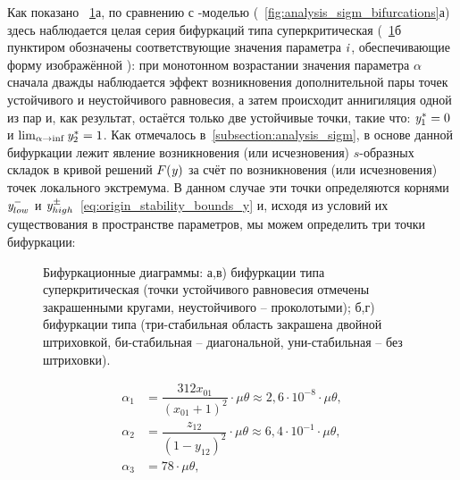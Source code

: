 Как показано \onfigure~\ref{fig:analysis_origin_bifurcations}а, по сравнению с -моделью (\seefigure~\ref{fig:analysis_sigm_bifurcations}а) здесь наблюдается целая серия бифуркаций типа суперкритическая  (\onfigure~\ref{fig:analysis_origin_bifurcations}б пунктиром обозначены соответствующие значения параметра $\mathit{i}$, обеспечивающие форму изображённой ): при монотонном возрастании значения параметра $\alpha$ сначала дважды наблюдается эффект возникновения дополнительной пары точек устойчивого и неустойчивого равновесия, а затем происходит аннигиляция одной из пар и, как результат, остаётся только две устойчивые точки, такие что: $\mathit{y}^{*}_{1} = 0$ и $\lim_{\alpha \to \inf} \mathit{y}^{*}_{2} = 1$. Как отмечалось в~\autoref{subsection:analysis_sigm}, в основе данной бифуркации лежит явление возникновения (или исчезновения) $s$-образных складок в кривой решений $F(\mathit{y})$ за счёт по возникновения (или исчезновения) точек локального экстремума. В данном случае эти точки определяются корнями $\mathit{y}^{-}_{low}$ и $\mathit{y}^{\pm}_{high}$~\eqref{eq:origin_stability_bounds_y} и, исходя из условий их существования в пространстве параметров, мы можем определить три точки бифуркации:
\begin{figure}[t]
    \caption{Бифуркационные диаграммы: а,в) бифуркации типа суперкритическая  (точки устойчивого равновесия отмечены закрашенными кругами, неустойчивого -- проколотыми); б,г) бифуркации типа  (три-стабильная область закрашена двойной штриховкой, би-стабильная -- диагональной, уни-стабильная -- без штриховки).}
    \label{fig:analysis_origin_bifurcations}
\end{figure}
\begin{equation}
    \label{eq:origin_bifurcation_alpha}
    \begin{aligned}
        \alpha_{1} &= \dfrac{312 x_{01}}{(x_{01} + 1)^2} \cdot \mu \theta \approx 2,6 \cdot 10^{-8} \cdot \mu \theta, \\
        \alpha_{2} &= \dfrac{z_{12}}{(1 - y_{12})^2} \cdot \mu \theta \approx 6,4 \cdot 10^{-1} \cdot \mu \theta, \\
        \alpha_{3} &= 78 \cdot \mu \theta, 
    \end{aligned}
\end{equation}
